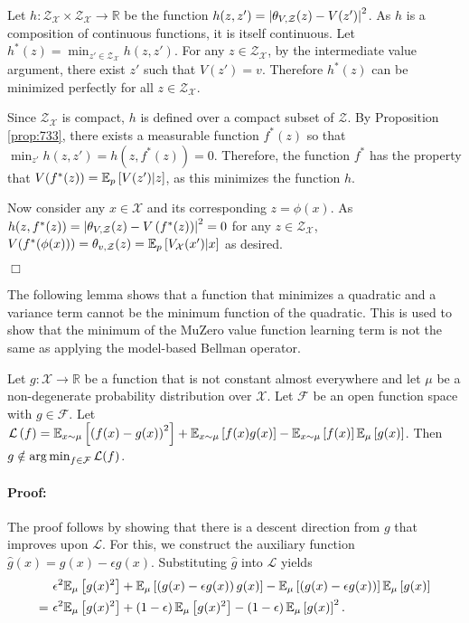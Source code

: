 Let $h: \mathcal{Z}_\mathcal{X} \times \mathcal{Z}_\mathcal{X} \rightarrow \mathbb{R}$ be the function $h(z,z') = \left|\theta_{V,\mathcal{Z}}(z) - V(z')\right|^2$.
As $h$ is a composition of continuous functions, it is itself continuous.
Let $h^*(z) = \min_{z' \in \mathcal{Z}_\mathcal{X}} h(z,z')$.
For any $z \in \mathcal{Z}_\mathcal{X}$, by the intermediate value argument, there exist $z'$ such that $V(z') = v$. 
Therefore $h^*(z)$ can be minimized perfectly for all $z \in \mathcal{Z}_\mathcal{X}$.

Since $\mathcal{Z}_\mathcal{X}$ is compact, $h$ is defined over a compact subset of $\mathcal{Z}$.
By Proposition \autoref{prop:733}, there exists a measurable function $f^*(z)$ so that $\min_{z'} h(z, z') = h(z, f^*(z)) = 0$.
Therefore, the function $f^*$ has the property that $V(f^*(z)) = \mathbb{E}_{p}\left[  V(z')|z \right]$, as this minimizes the function $h$.

Now consider any $x\in\mathcal{X}$ and its corresponding $z=\phi(x)$.
As $h(z, f^*(z))=\left|\theta_{V,\mathcal{Z}}(z) - V\left( f^*(z) \right)\right|^2 = 0$ for any $z \in \mathcal{Z}_\mathcal{X}$, $V(f^*(\phi(x))) = \theta_{v,\mathcal{Z}}(z) = \mathbb{E}_{p}\left[  V_\mathcal{X}(x')|x \right]$ as desired.

\hfill \ensuremath{\Box{}}

The following lemma shows that a function that minimizes a quadratic and a variance term cannot be the minimum function of the quadratic. This is used to show that the minimum of the MuZero value function learning term is not the same as applying the model-based Bellman operator.

\begin{lemma}
Let $g: \mathcal{X} \rightarrow \mathbb{R}$ be a function that is not constant almost everywhere and let $\mu$ be a non-degenerate probability distribution over $\mathcal{X}$. Let $\mathcal{F}$ be an open function space with $g \in \mathcal{F}$. Let $\mathcal{L}\left( f \right) = \mathbb{E}_{x\sim\mu}\left[ \left( f(x) - g(x) \right)^2 \right] + \mathbb{E}_{x\sim\mu}\left[ f(x) g(x) \right] - \mathbb{E}_{x\sim\mu}\left[ f(x) \right]\mathbb{E}_\mu\left[ g(x) \right]$.
Then $g \notin \operatorname*{arg\,min}_{f \in \mathcal{F}} \mathcal{L}(f)$.
\end{lemma}

\paragraph{Proof:}
The proof follows by showing that there is a descent direction from $g$ that improves upon $\mathcal{L}$. For this, we construct the auxiliary function $\hat{g}(x) = g(x) - \epsilon g(x)$.
Substituting $\hat{g}$ into $\mathcal{L}$ yields 
\begin{align*}
     &~\epsilon^2 \mathbb{E}_\mu\left[ g(x)^2 \right] + \mathbb{E}_\mu\left[ \left( g(x) - \epsilon g(x) \right) g(x) \right] - \mathbb{E}_\mu\left[ \left( g(x) - \epsilon g(x) \right) \right]\mathbb{E}_\mu\left[ g(x) \right]\\
     =&~\epsilon^2 \mathbb{E}_\mu\left[ g(x)^2 \right] + \left( 1-\epsilon \right)\mathbb{E}_\mu\left[ g(x)^2 \right] - \left( 1 - \epsilon \right) \mathbb{E}_\mu\left[ g(x) \right]^2.
\end{align*}

